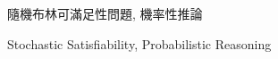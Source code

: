 




\frontmatter
\begin{acknowledgements}
  
\end{acknowledgements}

\begin{abstractzh}{隨機布林可滿足性問題, 機率性推論}
  
\end{abstractzh}

\begin{abstracten}{Stochastic Satisfiability, Probabilistic Reasoning}
  
\end{abstracten}

\tableofcontents
\clearpage
{}
\listoffigures
\clearpage
{}
\listoftables


\mainmatter




\footnotesize


